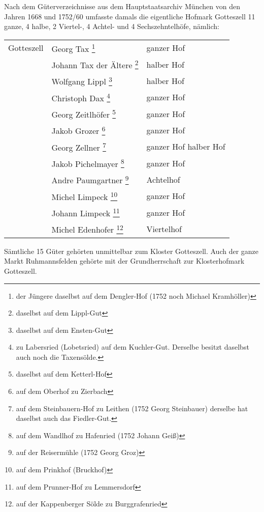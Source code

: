 \documentclass[12pt,a4pager,draft]{book}
\begin{document}
Nach dem Güterverzeichnisse aus dem Hauptstaatsarchiv München von den Jahren
1668 und 1752/60 umfasste damals die eigentliche Hofmark Gotteszell 11 ganze, 4
halbe, 2 Viertel-, 4 Achtel- und 4 Sechszehntelhöfe, nämlich:

\begin{longtable}{l|l|l}
Gotteszell & Georg Tax \footnote{der Jüngere daselbst auf dem Dengler-Hof (1752
noch Michael Kramhöller)} & ganzer Hof\\

& Johann Tax der Ältere \footnote{daselbst auf dem Lippl-Gut} & halber Hof\\

& Wolfgang Lippl \footnote{daselbst auf dem Ensten-Gut} & halber Hof\\

& Christoph Dax \footnote{zu Labersried (Lobetsried) auf dem Kuchler-Gut.
Derselbe besitzt daselbst auch noch die Taxensölde.} & ganzer Hof\\

& Georg Zeitlhöfer \footnote{daselbst auf dem Ketterl-Hof} & ganzer Hof\\

& Jakob Grozer \footnote{auf dem Oberhof zu Zierbach} & ganzer Hof\\

& Georg Zellner \footnote{auf dem Steinbauern-Hof zu Leithen (1752 Georg
Steinbauer) derselbe hat daselbst auch das Fiedler-Gut.} & ganzer Hof halber
Hof\\

& Jakob Pichelmayer \footnote{auf dem Wandlhof zu Hafenried (1752 Johann Geiß)}
& ganzer Hof\\

& Andre Paumgartner \footnote{auf der Reisermühle (1752 Georg Groz)} &
Achtelhof\\

& Michel Limpeck \footnote{auf dem Prinkhof (Bruckhof)} & ganzer Hof\\

& Johann Limpeck \footnote{auf dem Prunner-Hof zu Lemmersdorf} & ganzer Hof\\

& Michel Edenhofer \footnote{auf der Kappenberger Sölde zu Burggrafenried} &
Viertelhof\\
\end{longtable}

Sämtliche 15 Güter gehörten unmittelbar zum Kloster Gotteszell. Auch der ganze
Markt Ruhmannsfelden gehörte mit der Grundherrschaft zur Klosterhofmark
Gotteszell.
\end{document}

